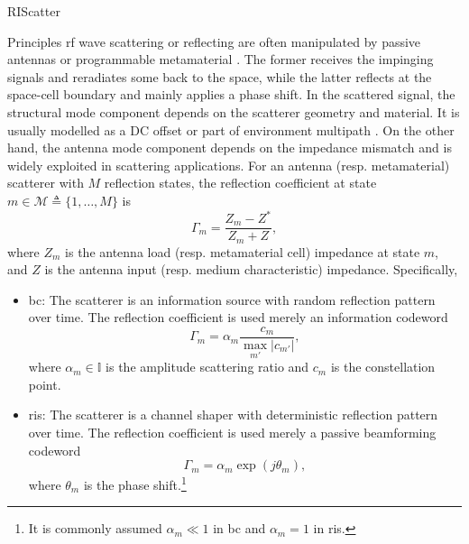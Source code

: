 \documentclass[journal]{IEEEtran}
\begin{document}
\begin{section}{RIScatter}
	\begin{subsection}{Principles}
		\gls{rf} wave scattering or reflecting are often manipulated by passive antennas or programmable metamaterial \cite{Liang2022}.
		The former receives the impinging signals and reradiates some back to the space, while the latter reflects at the space-cell boundary and mainly applies a phase shift.
		In the scattered signal, the structural mode component depends on the scatterer geometry and material.
		It is usually modelled as a DC offset \cite{Boyer2014} or part of environment multipath \cite{Thomas2012}.
		On the other hand, the antenna mode component depends on the impedance mismatch and is widely exploited in scattering applications.
		For an antenna (resp. metamaterial) scatterer with $M$ reflection states, the reflection coefficient at state $m \in \mathcal{M} \triangleq \{1,\ldots,M\}$ is
		\begin{equation}
			\Gamma_m = \frac{Z_m - Z^*}{Z_m + Z},
			\label{eq:reflection_coefficient}
		\end{equation}
		where $Z_m$ is the antenna load (resp. metamaterial cell) impedance at state $m$, and $Z$ is the antenna input (resp. medium characteristic) impedance.
		Specifically,
		\begin{itemize}
			\item \gls{bc}: The scatterer is an information source with random reflection pattern over time.
			The reflection coefficient is used merely an information codeword \cite{Thomas2012a}
			\begin{equation}
				\Gamma_m = \alpha_m \frac{c_m}{\max_{m'} \lvert c_{m'} \rvert},
				\label{eq:backscatter_modulation}
			\end{equation}
			where $\alpha_m \in \mathbb{I}$ is the amplitude scattering ratio and $c_m$ is the constellation point.
			\item \gls{ris}: The scatterer is a channel shaper with deterministic reflection pattern over time.
			The reflection coefficient is used merely a passive beamforming codeword \cite{Wu2018}
			\begin{equation}
				\Gamma_m = \alpha_m \exp(j \theta_m),
				\label{eq:passive_beamforming}
			\end{equation}
			where $\theta_m$ is the phase shift.\footnote{It is commonly assumed $\alpha_m \ll 1$ in \gls{bc} and $\alpha_m=1$ in \gls{ris}.}
		\end{itemize}


\end{subsection}
\end{section}
\end{document}
